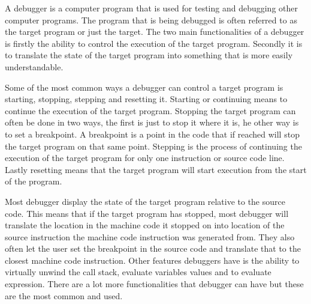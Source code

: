  


A debugger is a computer program that is used for testing and debugging other computer programs.
The program that is being debugged is often referred to as the target program or just the target.
The two main functionalities of a debugger is firstly the ability to control the execution of the target program.
Secondly it is to translate the state of the target program into something that is more easily understandable.


Some of the most common ways a debugger can control a target program is starting, stopping, stepping and resetting it.
Starting or continuing means to continue the execution of the target program.
Stopping the target program can often be done in two ways, the first is just to stop it where it is, he other way is to set a breakpoint.
A breakpoint is a point in the code that if reached will stop the target program on that same point.
Stepping is the process of continuing the execution of the target program for only one instruction or source code line.
Lastly resetting means that the target program will start execution from the start of the program.


Most debugger display the state of the target program relative to the source code.
This means that if the target program has stopped, most debugger will translate the location in the machine code it stopped on into location of the source instruction the machine code instruction was generated from.
They also often let the user set the breakpoint in the source code and translate that to the closest machine code instruction.
Other features debuggers have is the ability to virtually unwind the call stack, evaluate variables values and to evaluate expression.
There are a lot more functionalities that debugger can have but these are the most common and used.

